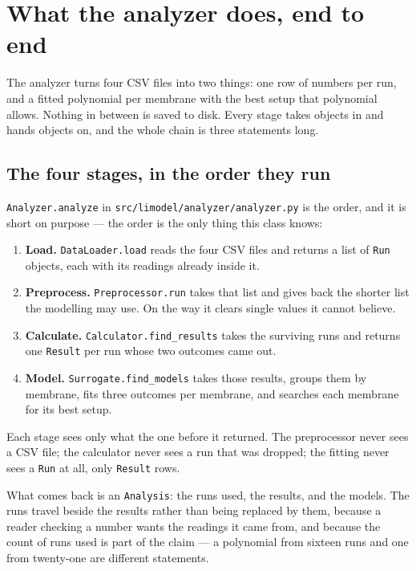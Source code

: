 \section{What the analyzer does, end to end}

The analyzer turns four CSV files into two things: one row of numbers per run, and a fitted
polynomial per membrane with the best setup that polynomial allows. Nothing in between is
saved to disk. Every stage takes objects in and hands objects on, and the whole chain is
three statements long.

\subsection{The four stages, in the order they run}

\texttt{Analyzer.analyze} in \texttt{src/limodel/analyzer/analyzer.py} is the order, and it is
short on purpose --- the order is the only thing this class knows:

\begin{enumerate}[nosep]
  \item \textbf{Load.} \texttt{DataLoader.load} reads the four CSV files and returns a list of
        \texttt{Run} objects, each with its readings already inside it.
  \item \textbf{Preprocess.} \texttt{Preprocessor.run} takes that list and gives back the
        shorter list the modelling may use. On the way it clears single values it cannot
        believe.
  \item \textbf{Calculate.} \texttt{Calculator.find\_results} takes the surviving runs
        and returns one \texttt{Result} per run whose two outcomes came out.
  \item \textbf{Model.} \texttt{Surrogate.find\_models} takes those results, groups them by
        membrane, fits three outcomes per membrane, and searches each membrane for its best
        setup.
\end{enumerate}

Each stage sees only what the one before it returned. The preprocessor never sees a CSV file;
the calculator never sees a run that was dropped; the fitting never sees a \texttt{Run} at all,
only \texttt{Result} rows.

What comes back is an \texttt{Analysis}: the runs used, the results, and the models. The runs
travel beside the results rather than being replaced by them, because a reader checking a
number wants the readings it came from, and because the count of runs used is part of the
claim --- a polynomial from sixteen runs and one from twenty-one are different statements.

